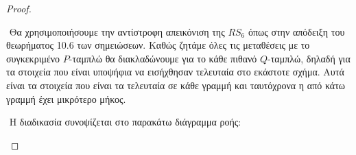 \documentclass[oneside,a4paper]{article}
\begin{document}
\vspace*{1cm}
\begin{proof} $ $

    $ $\newline
    Θα χρησιμοποιήσουμε την αντίστροφη απεικόνιση της $RS_6$ όπως στην απόδειξη του θεωρήματος 10.6 των σημειώσεων. Καθώς ζητάμε όλες τις μεταθέσεις με το συγκεκριμένο $P$-ταμπλώ θα διακλαδώνουμε για το κάθε πιθανό $Q$-ταμπλώ, δηλαδή για τα στοιχεία που είναι υποψήφια να εισήχθησαν τελευταία στο εκάστοτε σχήμα. Αυτά είναι τα στοιχεία που είναι τα τελευταία σε κάθε γραμμή και ταυτόχρονα η από κάτω γραμμή έχει μικρότερο μήκος. 

    $ $\newline
    Η διαδικασία συνοψίζεται στο παρακάτω διάγραμμα ροής:
    \vspace*{1cm}
    \begin{center}
\end{center}
\end{proof}
\end{document}
